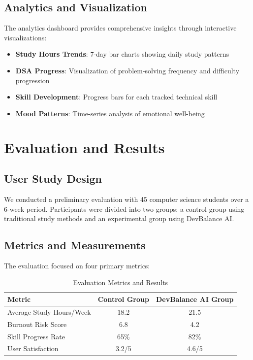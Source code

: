 \documentclass[conference,10pt]{IEEEtran}
\begin{document}
\subsection{Analytics and Visualization}

The analytics dashboard provides comprehensive insights through interactive visualizations:

\begin{itemize}
\item \textbf{Study Hours Trends}: 7-day bar charts showing daily study patterns
\item \textbf{DSA Progress}: Visualization of problem-solving frequency and difficulty progression
\item \textbf{Skill Development}: Progress bars for each tracked technical skill
\item \textbf{Mood Patterns}: Time-series analysis of emotional well-being
\end{itemize}

\section{Evaluation and Results}

\subsection{User Study Design}

We conducted a preliminary evaluation with 45 computer science students over a 6-week period. Participants were divided into two groups: a control group using traditional study methods and an experimental group using DevBalance AI.

\subsection{Metrics and Measurements}

The evaluation focused on four primary metrics:

\begin{table}[h]
\centering
\caption{Evaluation Metrics and Results}
\begin{tabular}{lcc}
\toprule
\textbf{Metric} & \textbf{Control Group} & \textbf{DevBalance AI Group} \\
\midrule
Average Study Hours/Week & 18.2 & 21.5 \\
Burnout Risk Score & 6.8 & 4.2 \\
Skill Progress Rate & 65\% & 82\% \\
User Satisfaction & 3.2/5 & 4.6/5 \\
\bottomrule
\end{tabular}
\end{table}
\end{document}
